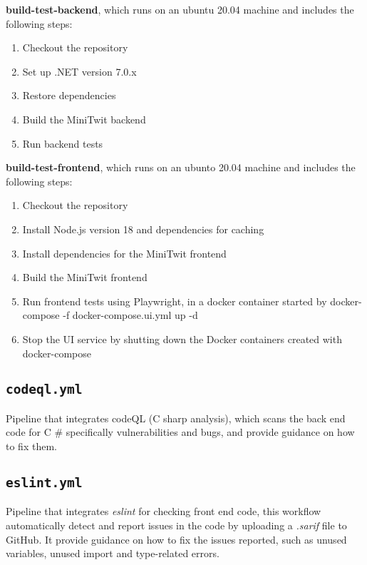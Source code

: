 \textbf{build-test-backend}, which runs on an ubuntu 20.04 machine and includes the following steps:

\begin{enumerate}
    \item Checkout the repository
    \item Set up .NET version 7.0.x
    \item Restore dependencies
    \item Build the MiniTwit backend
    \item Run backend tests
\end{enumerate}

\textbf{build-test-frontend}, which runs on an ubunto 20.04 machine and includes the following steps:

\begin{enumerate}
    \item Checkout the repository
    \item Install Node.js version 18 and dependencies for caching
    \item Install dependencies for the MiniTwit frontend
    \item Build the MiniTwit frontend
    \item Run frontend tests using Playwright, in a docker container started by docker-compose -f docker-compose.ui.yml up -d
    \item Stop the UI service by shutting down the Docker containers created with docker-compose
\end{enumerate}

\subsection{\texttt{codeql.yml}}

Pipeline that integrates codeQL (C sharp analysis), which  scans the back end code for C \# specifically vulnerabilities and bugs, and provide guidance on how to fix them.

\subsection{\texttt{eslint.yml}}
Pipeline that integrates \textit{eslint} for checking front end code, this workflow automatically detect and report issues in the code by uploading a \textit{.sarif} file to GitHub. It provide guidance on how to fix the issues reported, such as unused variables, unused import and type-related errors. 

